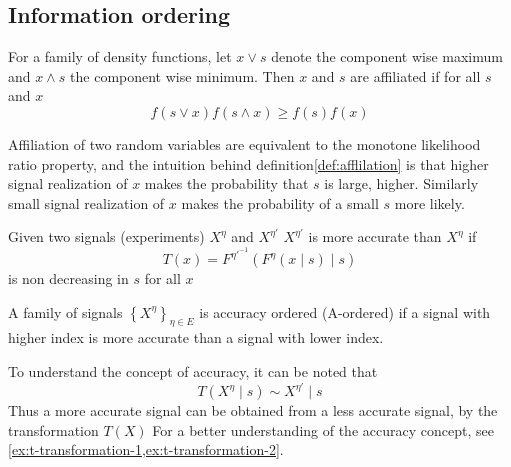 \documentclass[10pt,a4paper]{article} 					%
\begin{document}

\subsection{Information ordering}

\begin{defn}\label{def:afflilation} \parencite{Milgrom1982}
For a family of density functions, let \(x\lor s\) denote the component wise maximum and \(x\land s\) the component wise minimum. Then \(x\) and \(s\) are affiliated if for all \(s\) and \(x\)
\[
	f(s\lor x)f(s\land x)\ge f(s)f(x)
\]
\end{defn}

Affiliation of two random variables are equivalent to the monotone likelihood ratio property, and the intuition behind definition\cref{def:afflilation} is that higher signal realization of \(x\) makes the probability that \(s\) is large, higher. Similarly small signal realization of \(x\) makes the probability of a small \(s\) more likely.

\begin{defn}\label{def:accuracy}
\parencite{Persico2000} Given two signals (experiments) \(X^{\eta}\) and \(X^{\eta'}\)  \(X^{\eta'}\) is more accurate than \(X^{\eta}\) if
\[
	T(x)=F^{\eta'^{-1}}(F^{\eta}(x\mid s)\mid s)\label{eq:acuracy tranformation}
\]
is non decreasing in \(s\) for all \(x\)

A family of signals \(\left \{ X^{\eta}\right \} _{\eta\in E}\) is accuracy ordered (A-ordered) if a signal with higher index is more accurate than a signal with lower index.
\end{defn}

To understand the concept of accuracy, it can be noted that
\[
	T(X^{\eta}\mid s)\sim X^{\eta'}\mid s
\]
Thus a more accurate signal can be obtained from a less accurate signal, by the transformation \(T(X)\)  For a better understanding of the accuracy concept, see \cref{ex:t-transformation-1,ex:t-transformation-2}.
\end{document}

